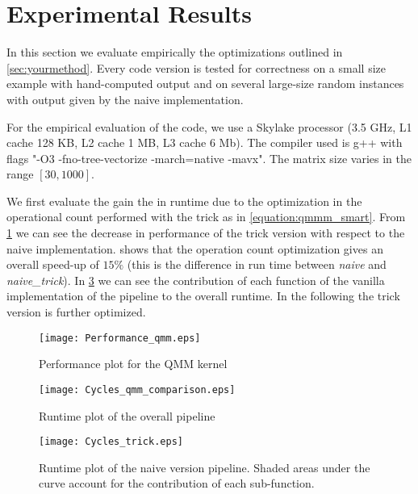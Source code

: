 \section{Experimental Results}\label{sec:exp}
\graphicspath{{../../plots/}}

In this section we evaluate empirically the optimizations outlined in \cref{sec:yourmethod}. Every code version is tested for correctness on a small size example with hand-computed output and on several large-size random instances with output given by the naive implementation.

For the empirical evaluation of the code, we use a Skylake processor (3.5 GHz, L1 cache 128 KB, L2 cache 1 MB, L3 cache 6 Mb). The compiler used is g++ with flags "-O3 -fno-tree-vectorize -march=native -mavx". The matrix size varies in the range $[30,1000]$.

We first evaluate the gain the in runtime due to the optimization in the operational count performed with the trick as in \cref{equation:qmmm_smart}. From \cref{figure:performance_qmm_kernel} we can see the decrease in performance of the trick version with respect to the naive implementation.  shows that the operation count optimization gives an overall speed-up of $15 \%$ (this is the difference in run time between \emph{naive} and \emph{naive\_trick}). In \cref{figure:Cycles_trick} we can see the contribution of each function of the vanilla implementation of the pipeline to the overall runtime. In the following the trick version is further optimized.

\begin{figure}[h]
\texttt{[image: Performance\_qmm.eps]}
\caption{Performance plot for the QMM kernel}
\label{figure:performance_qmm_kernel}
\end{figure}

\begin{figure}[h]
\texttt{[image: Cycles\_qmm\_comparison.eps]}
\caption{Runtime plot of the overall pipeline}
\label{figure:cycles_qmm_comparison}
\end{figure}

\begin{figure}[h]
\texttt{[image: Cycles\_trick.eps]}
\caption{Runtime plot of the naive version pipeline. Shaded areas under the curve account for the contribution of each sub-function. } 
\label{figure:Cycles_trick}
\end{figure}


